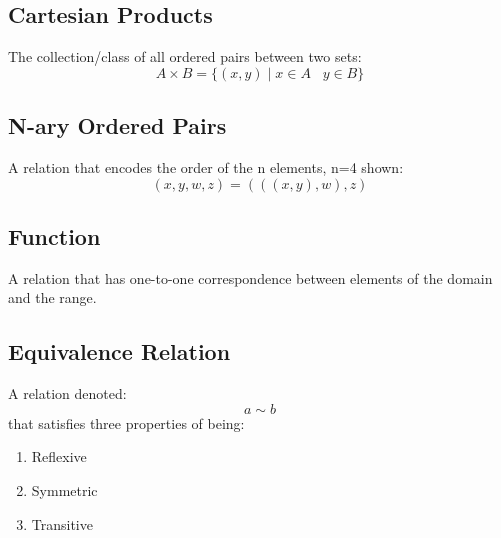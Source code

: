 \subsection{Cartesian Products}
\begin{defn}
	The collection/class of all ordered pairs between two sets:
	\[ A \times B = \{ (x, y) \mid x \in A \; \; \; y \in B \} \]
\end{defn}
\subsection{N-ary Ordered Pairs}
\begin{defn}
	A relation that encodes the order of the n elements, n=4 shown:
	\[ (x, y, w, z) = (((x, y), w), z)  \]
\end{defn}
\subsection{Function}
\begin{defn}[Function]
	A relation that has one-to-one correspondence between elements of the domain and the range.
\end{defn}
\subsection{Equivalence Relation}
A relation denoted:
\[ a \sim b \]
that satisfies three properties of being:
\begin{enumerate}
	\item Reflexive
	\item Symmetric
	\item Transitive
\end{enumerate}